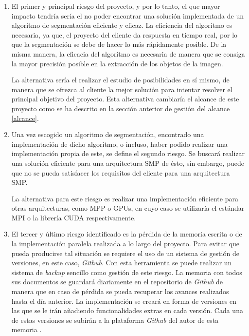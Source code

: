 \begin{enumerate}
	\item El primer y principal riesgo del proyecto, y por lo tanto, el que mayor impacto tendr\'{i}a ser\'{i}a el no poder encontrar una soluci\'{o}n implementada de un algoritmo de segmentaci\'{o}n eficiente y eficaz. La eficiencia del algoritmo es necesaria, ya que, el proyecto del cliente da respuesta en tiempo real, por lo que la segmentaci\'{o}n se debe de hacer lo m\'{a}s r\'{a}pidamente posible. De la misma manera, la eficacia del algoritmo es necesaria de manera que se consiga la mayor precisi\'{o}n posible en la extracci\'{o}n de los objetos de la imagen.
	
	La alternativa ser\'{i}a el realizar el estudio de posibilidades en s\'{i} mismo, de manera que se ofrezca al cliente la mejor soluci\'{o}n para intentar resolver el principal objetivo del proyecto. Esta alternativa cambiar\'{i}a el alcance de este proyecto como se ha descrito en la secci\'{o}n anterior de gesti\'{o}n del alcance \ref{alcance}.
	
	\item Una vez escogido un algoritmo de segmentaci\'{o}n, encontrado una implementaci\'{o}n de dicho algoritmo, o incluso, haber podido realizar una implementaci\'{o}n propia de este, se define el segundo riesgo. Se buscar\'{a} realizar una soluci\'{o}n eficiente para una arquitectura SMP de \'{e}sto, sin embargo, puede que no se pueda satisfacer los requisitos del cliente para una arquitectura SMP.
	
	La alternativa para este riesgo es realizar una implementaci\'{o}n eficiente para otras arquitecturas, como MPP o GPUs, en cuyo caso se utilizar\'{i}a el est\'{a}ndar MPI o la librer\'{i}a CUDA respectivamente.
	
	\item El tercer y \'{u}ltimo riesgo identificado es la p\'{e}rdida de la memoria escrita o de la implementaci\'{o}n paralela realizada a lo largo del proyecto. Para evitar que pueda producirse tal situaci\'{o}n se requiere el uso de un sistema de gesti\'{o}n de versiones, en este caso, \textit{Github}. Con esta herramienta se puede realizar un sistema de \textit{backup} sencillo como gesti\'{o}n de este riesgo. La memoria con todos sus documentos se guardar\'{a} diariamente en el repositorio de \textit{Github} de manera que en caso de p\'{e}rdida se pueda recuperar los avances realizados hasta el d\'{i}a anterior. La implementaci\'{o}n se crear\'{a} en forma de versiones en las que se le ir\'{a}n a\~{n}adiendo funcionalidades extras en cada versi\'{o}n. Cada una de estas versiones se subir\'{a}n a la plataforma \textit{Github} del autor de esta memoria \cite{gitHub1}. 
	

\end{enumerate}
